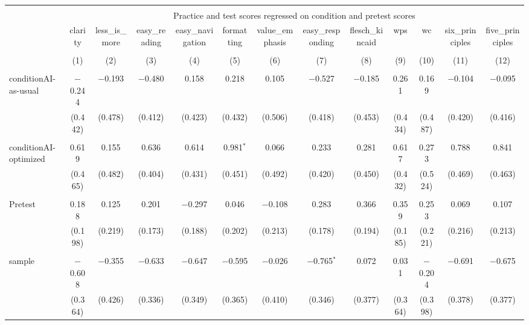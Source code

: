 
\begin{table}[!htbp] \centering 
  \caption{} 
  \label{} 
\begin{tabular}{@{\extracolsep{5pt}}lcccccccccccc} 
\\[-1.8ex]\hline 
\hline \\[-1.8ex] 
 & \multicolumn{12}{c}{Practice and test scores regressed on condition and pretest scores} \\ 
\cline{2-13} 
 & clarity & less_is_more & easy_reading & easy_navigation & formatting & value_emphasis & easy_responding & flesch_kincaid & wps & wc & six_principles & five_principles \\ 
\\[-1.8ex] & (1) & (2) & (3) & (4) & (5) & (6) & (7) & (8) & (9) & (10) & (11) & (12)\\ 
\hline \\[-1.8ex] 
 conditionAI-as-usual & $-$0.244 & $-$0.193 & $-$0.480 & 0.158 & 0.218 & 0.105 & $-$0.527 & $-$0.185 & 0.261 & 0.169 & $-$0.104 & $-$0.095 \\ 
  & (0.442) & (0.478) & (0.412) & (0.423) & (0.432) & (0.506) & (0.418) & (0.453) & (0.434) & (0.487) & (0.420) & (0.416) \\ 
  & & & & & & & & & & & & \\ 
 conditionAI-optimized & 0.619 & 0.155 & 0.636 & 0.614 & 0.981$^{*}$ & 0.066 & 0.233 & 0.281 & 0.617 & 0.273 & 0.788 & 0.841 \\ 
  & (0.465) & (0.482) & (0.404) & (0.431) & (0.451) & (0.492) & (0.420) & (0.450) & (0.432) & (0.524) & (0.469) & (0.463) \\ 
  & & & & & & & & & & & & \\ 
 Pretest & 0.188 & 0.125 & 0.201 & $-$0.297 & 0.046 & $-$0.108 & 0.283 & 0.366 & 0.359 & 0.253 & 0.069 & 0.107 \\ 
  & (0.198) & (0.219) & (0.173) & (0.188) & (0.202) & (0.213) & (0.178) & (0.194) & (0.185) & (0.221) & (0.216) & (0.213) \\ 
  & & & & & & & & & & & & \\ 
 sample & $-$0.608 & $-$0.355 & $-$0.633 & $-$0.647 & $-$0.595 & $-$0.026 & $-$0.765$^{*}$ & 0.072 & 0.031 & $-$0.204 & $-$0.691 & $-$0.675 \\ 
  & (0.364) & (0.426) & (0.336) & (0.349) & (0.365) & (0.410) & (0.346) & (0.377) & (0.364) & (0.398) & (0.378) & (0.377) \\ 

\end{tabular}
\end{table}
